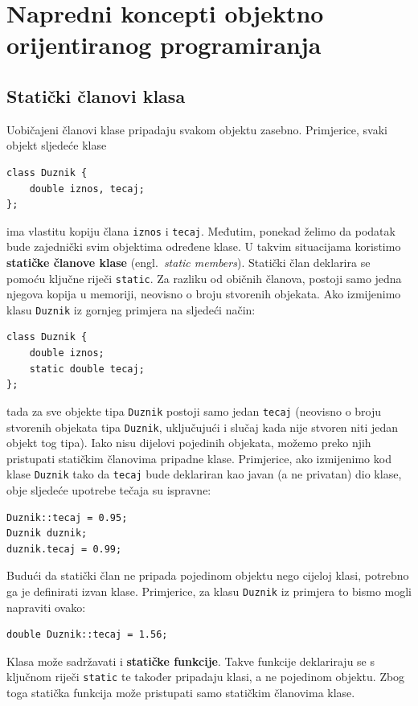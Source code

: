 \chapter{Napredni koncepti objektno orijentiranog programiranja}


\section{Statički članovi klasa}

Uobičajeni članovi klase pripadaju svakom objektu zasebno. 
Primjerice, svaki objekt sljedeće klase
\begin{verbatim}
class Duznik {
    double iznos, tecaj;
};
\end{verbatim}
ima vlastitu kopiju člana \texttt{iznos} i \texttt{tecaj}.
Međutim, ponekad želimo da podatak bude zajednički svim objektima određene klase. 
U takvim situacijama koristimo \textbf{statičke članove klase} (engl.\ \textit{static members}).
Statički član deklarira se pomoću ključne riječi 
\texttt{static}. 
Za razliku od običnih članova, postoji samo jedna njegova kopija u memoriji, neovisno o broju stvorenih objekata.
Ako izmijenimo klasu \texttt{Duznik} iz gornjeg primjera
na sljedeći način:
\begin{verbatim}
class Duznik {
    double iznos;
    static double tecaj;
};
\end{verbatim}
tada za sve objekte tipa \texttt{Duznik}
postoji samo jedan \texttt{tecaj}
(neovisno o broju stvorenih objekata tipa \texttt{Duznik},
uključujući i slučaj kada nije stvoren niti jedan objekt tog tipa).
Iako nisu dijelovi pojedinih objekata, možemo preko njih
pristupati statičkim članovima pripadne klase.
Primjerice, ako izmijenimo kod klase \texttt{Duznik} tako da \texttt{tecaj}
bude deklariran kao javan
(a ne privatan) dio klase,
obje sljedeće upotrebe tečaja su ispravne:
\begin{verbatim}
Duznik::tecaj = 0.95;
Duznik duznik;
duznik.tecaj = 0.99;
\end{verbatim}
\medskip

Budući da statički član ne pripada pojedinom objektu nego cijeloj klasi, potrebno ga je definirati izvan klase.
Primjerice, za klasu \texttt{Duznik} iz primjera to bismo 
mogli napraviti ovako:
\begin{verbatim}
double Duznik::tecaj = 1.56;
\end{verbatim}

Klasa može sadržavati i \textbf{statičke funkcije}. 
Takve funkcije deklariraju se s ključnom riječi \texttt{static}
te također pripadaju klasi, a ne pojedinom objektu.
Zbog toga statička funkcija može pristupati samo statičkim članovima klase.


